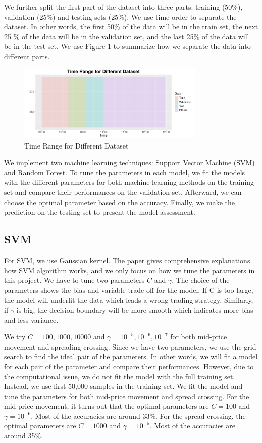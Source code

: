 \documentclass[11pt]{article}
\begin{document}
We further split the first part of the dataset into three parts: training (50\%), validation (25\%) and testing sets (25\%). We use time order to separate the dataset. In other words, the first 50\% of the data will be in the train set, the next 25 \% of the data will be in the validation set, and the last 25\% of the data will be in the test set.  We use Figure \ref{fig:figure1} to summarize how we separate the data into different parts.

\begin{figure}
  \centering
    \includegraphics[width=0.8\textwidth]{Figures/TimeRange}
  \caption{Time Range for Different Dataset}
  \label{fig:figure1}
\end{figure}

We implement two machine learning techniques: Support Vector Machine (SVM) and Random Forest. To tune the parameters in each model, we fit the models with the different parameters for both machine learning methods on the training set and compare their performances on the validation set. Afterward, we can choose the optimal parameter based on the accuracy. Finally, we make the prediction on the testing set to present the model assessment.



\subsection{SVM}
For SVM, we use Gaussian kernel. The paper gives comprehensive explanations how SVM algorithm works, and we only focus on how we tune the parameters in this project. We have to tune two parameters $C$ and $\gamma$. The choice of the parameters shows the bias and variable trade-off for the model. If C is too large, the model will underfit the data which leads a wrong trading strategy. Similarly, if $\gamma$ is big, the decision boundary will be more smooth which indicates more bias and less variance.

We try $C=100, 1000, 10000$ and $\gamma=10^{-5}, 10^{-6}, 10^{-7}$ for both mid-price movement and spreading crossing. Since we have two parameters, we use the grid search to find the ideal pair of the parameters. In other words, we will fit a model for each pair of the parameter and compare their performances. However, due to the computational issue, we do not fit the model with the full training set. Instead, we use first 50,000 samples in the training set. We fit the model and tune the parameters for both mid-price movement and spread crossing. For the mid-price movement, it turns out that the optimal parameters are $C=100$ and $\gamma=10^{-6}$. Most of the accuracies are around 33\%. For the spread crossing, the optimal parameters are $C=1000$ and $\gamma=10^{-5}$. Most of the accuracies are around 35\%.
\end{document}
